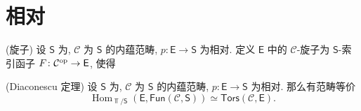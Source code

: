 \chapter{相对\topos{}}

\minitoc

\begin{definition}
	{(旋子)}
	设 $\mathsf S$ 为\topos{}, $\mathcal C$ 为 $\mathsf S$ 的内蕴范畴, $p\colon \mathsf E\to\mathsf S$ 为相对\topos{}. 定义 $\mathsf E$ 中的 $\mathcal C$-旋子为 $\mathsf S$-索引函子 $F\colon \mathcal C^{\text{op}}\to\mathsf E$, 使得
\end{definition}

\begin{prop}
	{(Diaconescu 定理)}
	设 $\mathsf S$ 为\topos{}, $\mathcal C$ 为 $\mathsf S$ 的内蕴范畴, $p\colon \mathsf E\to\mathsf S$ 为相对\topos{}. 那么有范畴等价
	\[
	\operatorname{Hom}_{\Top/\mathsf S}
	(\mathsf E,\mathsf {Fun}(\mathcal C,\mathsf S))
	\simeq \mathsf {Tors}(\mathcal C,\mathsf E).
	\]
\end{prop}